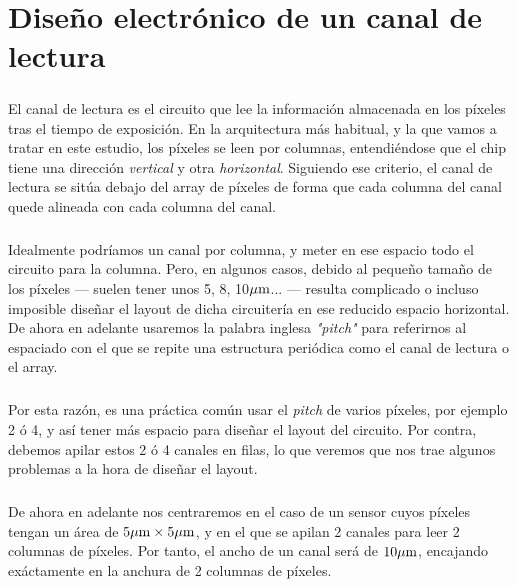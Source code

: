 \chapter{Diseño electrónico de un canal de lectura}\label{cap:ro_sch}

\paragraph{}
El canal de lectura es el circuito que lee la información almacenada en los píxeles
tras el tiempo de exposición.
En la arquitectura más habitual, y la que vamos a tratar en este estudio, los
píxeles se leen por columnas, entendiéndose que el chip tiene una dirección
\textit{vertical} y otra \textit{horizontal}. Siguiendo ese criterio, el canal de lectura se
sitúa debajo del array de píxeles de forma que cada columna del canal quede alineada
con cada columna del canal.

\paragraph{}
Idealmente podríamos un canal por columna, y meter en ese espacio todo el circuito
para la columna. Pero, en algunos casos, debido al pequeño tamaño de los píxeles
--- suelen tener unos 5, 8, 10$\mu\text{m}$... --- resulta complicado o incluso imposible diseñar el
layout de dicha circuitería en ese reducido espacio horizontal. De ahora en adelante
usaremos la palabra inglesa \textit{"pitch"} para referirnos al espaciado con el
que se repite una estructura periódica como el canal de lectura o el array.

\paragraph{}
Por esta razón, es una práctica común usar el \textit{pitch} de varios píxeles, por
ejemplo 2 ó 4, y así tener más espacio para diseñar el layout del circuito. Por contra,
debemos apilar estos 2 ó 4 canales en filas, lo que veremos que nos trae algunos
problemas a la hora de diseñar el layout.

\paragraph{}
De ahora en adelante nos centraremos en el caso de un sensor cuyos píxeles tengan
un área de $5\mu\text{m} \times 5\mu\text{m}$, y en el que se apilan 2 canales para leer 2
columnas de píxeles. Por tanto, el ancho de un canal será de $10\mu\text{m}$, encajando
exáctamente en la anchura de 2 columnas de píxeles.

